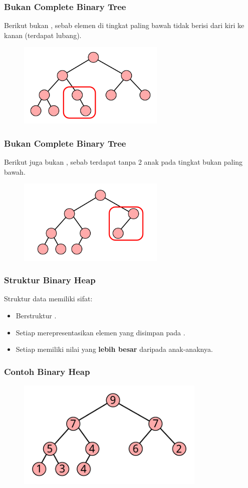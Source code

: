 \begin{frame}
\frametitle{Bukan Complete Binary Tree}
Berikut bukan , sebab elemen di tingkat paling bawah tidak berisi dari kiri ke kanan (terdapat lubang).
\begin{figure}
  \includegraphics[width=7cm]{asset/not-complete-binary-tree-1.pdf}
\end{figure}
\end{frame}

\begin{frame}
\frametitle{Bukan Complete Binary Tree}
Berikut juga bukan , sebab terdapat \fnode tanpa 2 anak pada tingkat bukan paling bawah.
\begin{figure}
  \includegraphics[width=7cm]{asset/not-complete-binary-tree-2.pdf}
\end{figure}
\end{frame}

\begin{frame}
\frametitle{Struktur Binary Heap}
Struktur data \pbinaryHeap memiliki sifat:
\begin{itemize}
  \item Berstruktur .
  \item Setiap \fnode merepresentasikan elemen yang disimpan pada \pheap.
  \item Setiap \fnode memiliki nilai yang \textbf{lebih besar} daripada \fnode anak-anaknya.
\end{itemize}
\end{frame}

\begin{frame}
\frametitle{Contoh Binary Heap}
\begin{figure}
  \includegraphics[width=9cm]{asset/heap.pdf}
\end{figure}
\end{frame}

